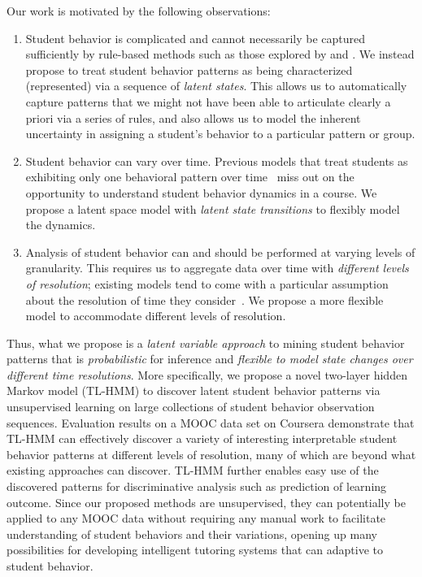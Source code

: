 Our work is motivated by the following observations:
\begin{enumerate}
  \item Student behavior is complicated and cannot necessarily be captured
      sufficiently by rule-based methods such as those explored by
      \citet{Kizilcec:2013:LAK} and \citet{Davis:2016:EDM}. We instead
      propose to treat student behavior patterns as being characterized
      (represented) via a sequence of \emph{latent states}. This allows us
      to automatically capture patterns that we might not have been able to
      articulate clearly a priori via a series of rules, and also allows us
      to model the inherent uncertainty in assigning a student's behavior
      to a particular pattern or group.
  \item Student behavior can vary over time. Previous models that treat students
      as exhibiting only one behavioral pattern over
      time~\cite{Faucon:2016:EDM} miss out on the opportunity to understand
      student behavior dynamics in a course. We propose a latent space
      model with {\em latent state transitions} to flexibly model the
      dynamics.
  \item Analysis of student behavior can and should be performed at varying
      levels of granularity. This requires us to aggregate data over time
      with \emph{different levels of resolution}; existing models tend to come
      with a particular assumption about the resolution of time they
      consider~\cite{Faucon:2016:EDM, Kizilcec:2013:LAK, Shih:2010:EDM}. We
      propose a more flexible model to accommodate different levels of
      resolution.
\end{enumerate}

Thus, what we propose is a \emph{latent variable approach} to mining student behavior
patterns that is \emph{probabilistic} for inference and 
\emph{flexible to model state changes over different time resolutions}. 
More specifically, we propose a novel two-layer hidden Markov model (TL-HMM) to
 discover latent student behavior patterns via
unsupervised learning on large collections of student behavior observation
sequences. Evaluation results on a MOOC data set on Coursera demonstrate that TL-HMM can effectively 
discover a variety of interesting interpretable student behavior patterns at different levels of resolution, many of which are beyond what existing approaches can discover. TL-HMM further enables easy use of the discovered patterns for discriminative analysis such as prediction of learning outcome. 
Since our proposed methods are unsupervised, they can potentially be applied to any MOOC data without requiring any manual work to facilitate understanding of student behaviors and their variations, opening up many possibilities for developing intelligent tutoring systems that can adaptive to student behavior. 


